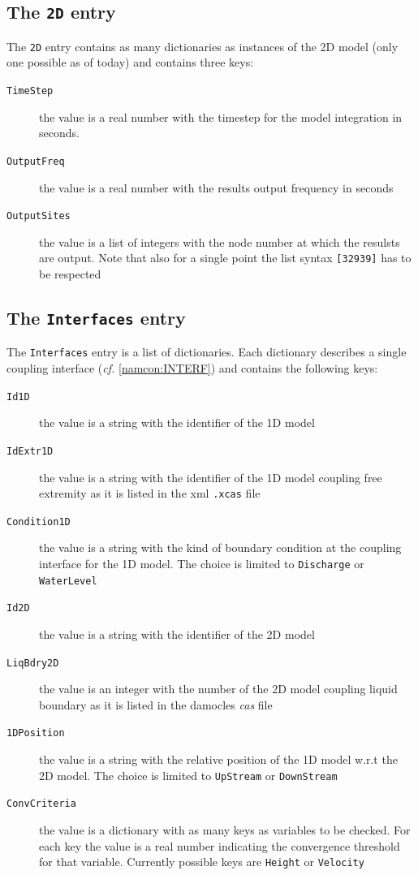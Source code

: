 \subsection{The \texttt{2D} entry}
The \texttt{2D} entry contains as many dictionaries as instances of the 2D
model (only one possible as of today) and contains three keys:
\begin{description}
  \item[\texttt{TimeStep}] the value is a real number with the
    timestep for the model integration in seconds.
  \item[\texttt{OutputFreq}] the value is a real number with the
    results output frequency in seconds
  \item[\texttt{OutputSites}] the value is a list of integers with the
    node number at which the resulsts are output. Note that also for a
    single point the list syntax \texttt{[32939]} has to be respected
\end{description}

\subsection{The \texttt{Interfaces} entry}
The \texttt{Interfaces} entry is a list of dictionaries.
Each dictionary describes a single coupling interface ({\em cf.}
\ref{namcon:INTERF}) and contains the following keys:
\begin{description}
  \item[\texttt{Id1D}] the value is a string with the identifier of
    the 1D model
  \item[\texttt{IdExtr1D}] the value is a string with the identifier of
    the 1D model coupling free extremity as it is listed in the xml
    \texttt{.xcas} file
  \item[\texttt{Condition1D}] the value is a string with the kind of
    boundary condition at the coupling interface for the 1D model. The
    choice is limited to \texttt{Discharge} or \texttt{WaterLevel}
  \item[\texttt{Id2D}] the value is a string with the identifier of
    the 2D model
  \item[\texttt{LiqBdry2D}] the value is an integer with the number of
    the 2D model coupling liquid boundary as it is listed in the damocles
    {\em cas} file
  \item[\texttt{1DPosition}] the value is a string with the relative
    position of the 1D model w.r.t the 2D model. The
    choice is limited to \texttt{UpStream} or \texttt{DownStream}
  \item[\texttt{ConvCriteria}] the value is a dictionary with as many
    keys as variables to be checked. For each key the value is a real
    number indicating the convergence threshold for that
    variable. Currently possible keys are \texttt{Height} or \texttt{Velocity}
\end{description}


